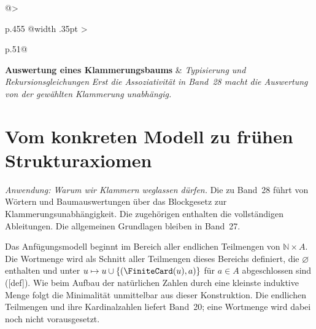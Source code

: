\begin{longtable}{@{}>{\raggedright\arraybackslash}p{.455\linewidth}%
  @{\hspace{.012\linewidth}\vrule width .35pt\hspace{.012\linewidth}}%
  >{\raggedright\arraybackslash}p{.51\linewidth}@{}}
\textbf{Auswertung eines Klammerungsbaums}
&
\textit{Typisierung und Rekursionsgleichungen}
\textit{Erst die Assoziativität in Band~28 macht die Auswertung von der
gewählten Klammerung unabhängig.}\\

\end{longtable}
\endgroup

\section*{Vom konkreten Modell zu frühen Strukturaxiomen}

\noindent\emph{Anwendung: Warum wir Klammern weglassen dürfen.}
Die \BracketingReadingLink{} zu Band~28 führt von Wörtern und
Baumauswertungen über das Blockgesetz zur Klammerungsunabhängigkeit.
Die zugehörigen \BracketingProofsLink{} enthalten die vollständigen
Ableitungen. Die allgemeinen Grundlagen bleiben in Band~27.
\par\medskip

Das Anfügungsmodell beginnt im Bereich aller endlichen Teilmengen von
\(\mathbb N\times A\). Die Wortmenge wird als Schnitt aller Teilmengen
dieses Bereichs definiert, die \(\varnothing\) enthalten und unter
\(u\mapsto u\cup\{(\FiniteCard(u),a)\}\) für \(a\in A\) abgeschlossen sind
([def]). Wie beim Aufbau der natürlichen
Zahlen durch eine kleinste induktive Menge folgt die Minimalität
unmittelbar aus dieser Konstruktion. Die endlichen Teilmengen und ihre
Kardinalzahlen liefert Band~20; eine Wortmenge wird dabei noch nicht
vorausgesetzt.

